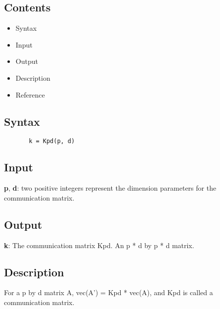 \documentclass[a4paper,11pt,openany]{memoir}
\begin{document}
\subsection*{Contents}

\begin{itemize}
\setlength{\itemsep}{-1ex}
   \item Syntax
   \item Input
   \item Output
   \item Description
   \item Reference
\end{itemize}


\subsection*{Syntax}


\begin{verbatim}       k = Kpd(p, d)\end{verbatim}
    

\subsection*{Input}

\begin{par}
\textbf{p}, \textbf{d}: two positive integers represent the dimension parameters for the communication matrix.
\end{par} \vspace{1em}


\subsection*{Output}

\begin{par}
\textbf{k}: The communication matrix Kpd. An p * d by p * d matrix.
\end{par} \vspace{1em}


\subsection*{Description}

\begin{par}
For a p by d matrix A, vec(A') = Kpd * vec(A), and Kpd is called a communication matrix.
\end{par} \vspace{1em}
\end{document}
